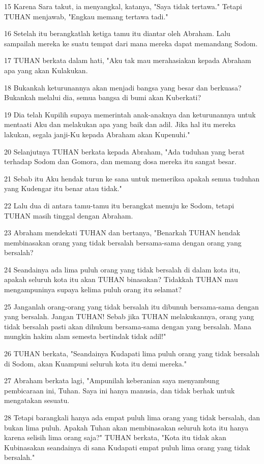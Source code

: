 \par 15 Karena Sara takut, ia menyangkal, katanya, "Saya tidak tertawa." Tetapi TUHAN menjawab, "Engkau memang tertawa tadi."
\par 16 Setelah itu berangkatlah ketiga tamu itu diantar oleh Abraham. Lalu sampailah mereka ke suatu tempat dari mana mereka dapat memandang Sodom.
\par 17 TUHAN berkata dalam hati, "Aku tak mau merahasiakan kepada Abraham apa yang akan Kulakukan.
\par 18 Bukankah keturunannya akan menjadi bangsa yang besar dan berkuasa? Bukankah melalui dia, semua bangsa di bumi akan Kuberkati?
\par 19 Dia telah Kupilih supaya memerintah anak-anaknya dan keturunannya untuk mentaati Aku dan melakukan apa yang baik dan adil. Jika hal itu mereka lakukan, segala janji-Ku kepada Abraham akan Kupenuhi."
\par 20 Selanjutnya TUHAN berkata kepada Abraham, "Ada tuduhan yang berat terhadap Sodom dan Gomora, dan memang dosa mereka itu sangat besar.
\par 21 Sebab itu Aku hendak turun ke sana untuk memeriksa apakah semua tuduhan yang Kudengar itu benar atau tidak."
\par 22 Lalu dua di antara tamu-tamu itu berangkat menuju ke Sodom, tetapi TUHAN masih tinggal dengan Abraham.
\par 23 Abraham mendekati TUHAN dan bertanya, "Benarkah TUHAN hendak membinasakan orang yang tidak bersalah bersama-sama dengan orang yang bersalah?
\par 24 Seandainya ada lima puluh orang yang tidak bersalah di dalam kota itu, apakah seluruh kota itu akan TUHAN binasakan? Tidakkah TUHAN mau mengampuninya supaya kelima puluh orang itu selamat?
\par 25 Janganlah orang-orang yang tidak bersalah itu dibunuh bersama-sama dengan yang bersalah. Jangan TUHAN! Sebab jika TUHAN melakukannya, orang yang tidak bersalah pasti akan dihukum bersama-sama dengan yang bersalah. Mana mungkin hakim alam semesta bertindak tidak adil!"
\par 26 TUHAN berkata, "Seandainya Kudapati lima puluh orang yang tidak bersalah di Sodom, akan Kuampuni seluruh kota itu demi mereka."
\par 27 Abraham berkata lagi, "Ampunilah keberanian saya menyambung pembicaraan ini, Tuhan. Saya ini hanya manusia, dan tidak berhak untuk mengatakan sesuatu.
\par 28 Tetapi barangkali hanya ada empat puluh lima orang yang tidak bersalah, dan bukan lima puluh. Apakah Tuhan akan membinasakan seluruh kota itu hanya karena selisih lima orang saja?" TUHAN berkata, "Kota itu tidak akan Kubinasakan seandainya di sana Kudapati empat puluh lima orang yang tidak bersalah."

